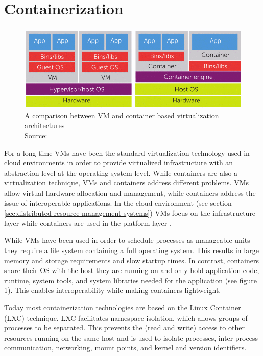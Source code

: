 \section{Containerization}

\begin{figure}
  \centering
  \includegraphics[width=0.8\linewidth]{resources/vm-vs-container.png}
  \caption{
    A comparison between VM and container based virtualization architectures\\
    Source:  \cite{ieee-containers}
  }
  \label{fig:vm-vs-container}
\end{figure}

For a long time VMs have been the standard virtualization technology used in
cloud environments in order to provide virtualized infrastructure with an
abstraction level at the operating system level. While containers are also a
virtualization technique, VMs and containers address different problems. VMs
allow virtual hardware allocation and management, while containers address the
issue of interoperable applications. In the cloud environment (see section
\ref{sec:distributed-resource-management-systems}) VMs focus on the
infrastructure layer while containers are used in the platform layer
\cite{ieee-containers}.

While VMs have been used in order to schedule processes as manageable units they
require a file system containing a full operating system. This results in large
memory and storage requirements and slow startup times. In contrast, containers
share their OS with the host they are running on and only hold application code,
runtime, system tools, and system libraries needed for the application (see
figure \ref{fig:vm-vs-container}). This enables interoperability while making
containers lightweight.

Today most containerization technologies are based on the Linux Container (LXC)
technique. LXC facilitates namespace isolation, which allows groups of processes
to be separated. This prevents the (read and write) access to other resources
running on the same host and is used to isolate processes, inter-process
communication, networking, mount points, and kernel and version identifiers.

